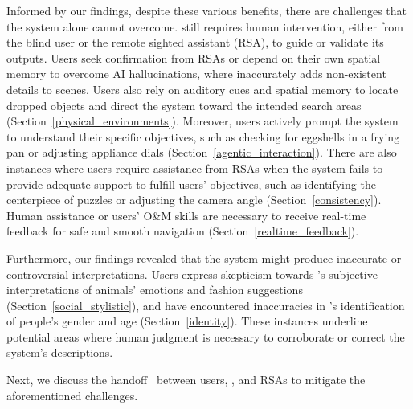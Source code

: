 Informed by our findings, despite these various benefits, there are challenges that the system alone cannot overcome.  
\bma{} still requires human intervention, either from the blind user or the remote sighted assistant (RSA), to guide or validate its outputs.  
% 
Users seek confirmation from RSAs or depend on their own spatial memory to overcome AI hallucinations, where \sbma{} inaccurately adds non-existent details to scenes. Users also rely on auditory cues and spatial memory to locate dropped objects and direct the system toward the intended search areas (Section~\ref{physical_environments}).
% 
Moreover, users actively prompt the system to understand their specific objectives, such as checking for eggshells in a frying pan or adjusting appliance dials (Section~\ref{agentic_interaction}). 
% 
There are also instances where users require assistance from RSAs when the system fails to provide adequate support to fulfill users' objectives, such as identifying the centerpiece of puzzles or adjusting the camera angle (Section~\ref{consistency}).
% 
Human assistance or users' O\&M skills are necessary to receive real-time feedback for safe and smooth navigation (Section~\ref{realtime_feedback}). 



Furthermore, our findings revealed that the system might produce inaccurate or controversial interpretations. Users express skepticism towards \sbma's subjective interpretations of animals' emotions and fashion suggestions (Section~\ref{social_stylistic}), and have encountered inaccuracies in \sbma's identification of people's gender and age (Section~\ref{identity}). These instances underline potential areas where human judgment is necessary to corroborate or correct the system's descriptions.





Next, we discuss the handoff~\cite{mulligan2020concept} between users, \bma, and RSAs to mitigate the aforementioned challenges. 












